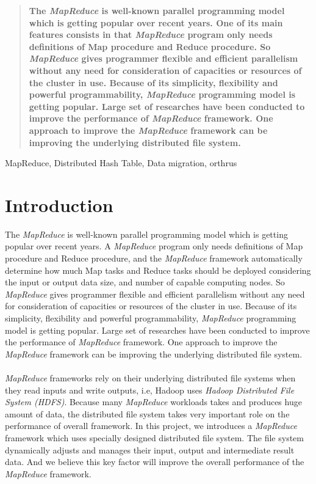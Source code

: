 \begin{abstract}
\textbf{
The \textit{MapReduce} is well-known parallel programming model which is getting popular over recent years.
One of its main features consists in that \textit{MapReduce} program only needs definitions of Map procedure and Reduce procedure.
So \textit{MapReduce} gives programmer flexible and efficient parallelism without any need for consideration of 
capacities or resources of the cluster in use.
Because of its simplicity, flexibility and powerful programmability, \textit{MapReduce} programming model is 
getting popular. Large set of researches have been conducted to improve the performance of \textit{MapReduce} framework.
One approach to improve the \textit{MapReduce} framework can be improving the underlying distributed file system. 
}
\end{abstract}

\keywords
MapReduce, Distributed Hash Table, Data migration, orthrus

\section*{Introduction}
The \textit{MapReduce} is well-known parallel programming model which is getting popular over recent years.
A \textit{MapReduce} program only needs definitions of Map procedure and Reduce procedure, 
and the \textit{MapReduce} framework automatically determine how much Map tasks and Reduce tasks should be 
deployed considering the input or output data size, and number of capable computing nodes.
So \textit{MapReduce} gives programmer flexible and efficient parallelism without any need for consideration of 
capacities or resources of the cluster in use.
Because of its simplicity, flexibility and powerful programmability, \textit{MapReduce} programming model is 
getting popular. Large set of researches have been conducted to improve the performance of \textit{MapReduce} framework.
One approach to improve the \textit{MapReduce} framework can be improving the underlying distributed file system. 
\\ \\
\textit{MapReduce} frameworks rely on their underlying distributed file systems when they read inputs and write outputs, 
i.e, Hadoop uses \textit{Hadoop Distributed File System (HDFS)}. 
Because many \textit{MapReduce} workloads takes and produces huge amount of data, 
the distributed file system takes very important role on the performance of overall framework. 
In this project, we introduces a \textit{MapReduce} framework which uses specially designed distributed file system.
The file system dynamically adjusts and manages their input, output and intermediate result data. 
And we believe this key factor will improve the overall performance of the \textit{MapReduce} framework.


